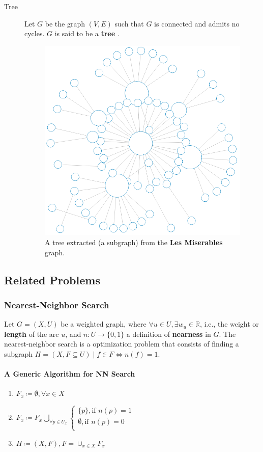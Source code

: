 \documentclass[12pt]{report}
\begin{document}
\begin{description}
	\item[Tree] Let $G$ be the graph $(V, E)$ such that $G$ is connected and admits no cycles. $G$ is  said to be a \textbf{tree} \cite{berge1973}.

	\begin{figure}[H]
		\centering
		\includegraphics[width=.4\linewidth]{graphs/tree}
		\captionsetup{justification=centering}
		\caption{A tree extracted (a subgraph) from the \textbf{Les Miserables} graph.}
		\label{tree}
	\end{figure}
\end{description}

\subsection{Related Problems}

\subsubsection{Nearest-Neighbor Search}

Let $G = (X, U)$ be a weighted graph, where $ \forall u \in U, \exists w_u \in \mathbb{R}$, i.e., the weight or \textbf{length} of the arc $u$, and $n\colon U \to \{0, 1\}$ a definition of \textbf{nearness} in $G$. The nearest-neighbor search is a optimization problem that consists of finding a subgraph $H = (X, F \subseteq U) \mid f \in F \iff n(f) = 1$.

\paragraph{A Generic Algorithm for NN Search}
\begin{enumerate}
	\item $F_x \coloneqq \emptyset, \forall x \in X$
	\item $F_x \coloneqq F_x \bigcup_{\forall p \in U_x} \begin{cases}
	\{p\}, \text{if } n(p) = 1 \\
	\emptyset, \text{if } n(p) = 0 \\
	\end{cases}$
	\item $H \coloneqq (X, F), F = \cup_{x\in X} F_x$
\end{enumerate}
\end{document}
